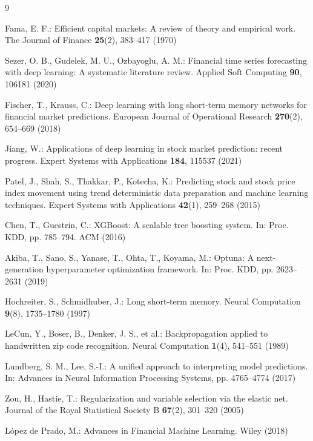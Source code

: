 \documentclass[runningheads]{llncs}
\begin{document}
\begin{thebibliography}{9}

Fama, E. F.: Efficient capital markets: A review of theory and empirical work. The Journal of Finance \textbf{25}(2), 383--417 (1970)

Sezer, O. B., Gudelek, M. U., Ozbayoglu, A. M.: Financial time series forecasting with deep learning: A systematic literature review. Applied Soft Computing \textbf{90}, 106181 (2020)

Fischer, T., Krauss, C.: Deep learning with long short-term memory networks for financial market predictions. European Journal of Operational Research \textbf{270}(2), 654--669 (2018)

Jiang, W.: Applications of deep learning in stock market prediction: recent progress. Expert Systems with Applications \textbf{184}, 115537 (2021)

Patel, J., Shah, S., Thakkar, P., Kotecha, K.: Predicting stock and stock price index movement using trend deterministic data preparation and machine learning techniques. Expert Systems with Applications \textbf{42}(1), 259--268 (2015)

Chen, T., Guestrin, C.: XGBoost: A scalable tree boosting system. In: Proc. KDD, pp. 785--794. ACM (2016)

Akiba, T., Sano, S., Yanase, T., Ohta, T., Koyama, M.: Optuna: A next-generation hyperparameter optimization framework. In: Proc. KDD, pp. 2623--2631 (2019)

Hochreiter, S., Schmidhuber, J.: Long short-term memory. Neural Computation \textbf{9}(8), 1735--1780 (1997)

LeCun, Y., Boser, B., Denker, J. S., et al.: Backpropagation applied to handwritten zip code recognition. Neural Computation \textbf{1}(4), 541--551 (1989)

Lundberg, S. M., Lee, S.-I.: A unified approach to interpreting model predictions. In: Advances in Neural Information Processing Systems, pp. 4765--4774 (2017)

Zou, H., Hastie, T.: Regularization and variable selection via the elastic net. Journal of the Royal Statistical Society B \textbf{67}(2), 301--320 (2005)

L\'opez de Prado, M.: Advances in Financial Machine Learning. Wiley (2018)

\end{thebibliography}
\end{document}
